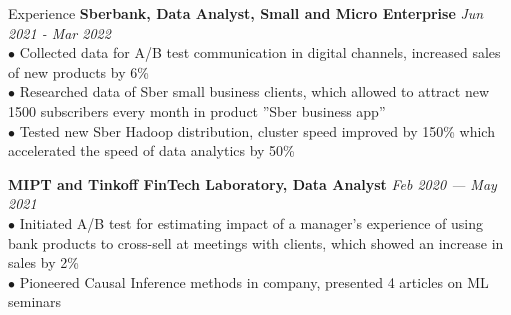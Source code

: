 \documentclass{resume} %
\begin{document}
\begin{rSection}{ Experience }
    { \bf Sberbank, Data Analyst, Small and Micro Enterprise} \hfill {\em Jun 2021 - Mar 2022}\\
    { $\bullet$ Collected data for A/B test communication in digital channels, increased sales of new products by 6\% }\\
    { $\bullet$ Researched data of Sber small business clients, which allowed to attract new 1500 subscribers every month in product ''Sber business app'' }\\
    { $\bullet$ Tested new Sber Hadoop distribution, cluster speed improved by 150\% which accelerated the speed of data analytics by 50\%}
    
    { \bf MIPT and Tinkoff FinTech Laboratory, Data Analyst } \hfill {\em Feb 2020 — May 2021}\\
    { $\bullet$ Initiated A/B test for estimating impact of a manager's experience of using bank products to cross-sell at meetings with clients, which showed an increase in sales by 2\% }\\
    { $\bullet$ Pioneered Causal Inference methods in company, presented 4 articles on ML seminars }

\end{rSection}



    
\end{document}

